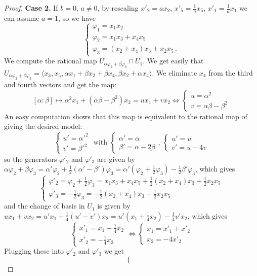 \documentclass[10pt,reqno]{amsart}
\newcommand{\la}{\langle}
\newcommand{\ra}{\rangle}
\renewcommand{\a}{\alpha}
\renewcommand{\b}{\beta}
\newcommand{\f}{\varphi}
\theoremstyle{definition}
\begin{document}
\begin{proof}
\noindent \textbf{Case 2.} If $b=0$, $a \ne 0$, by rescaling $x'_2=a x_2$, $x'_5=\frac1ax_5$, $x'_1=\frac1ax_1$ we can assume $a=1$, so we have 
\[
\begin{cases}
    \f_1=x_1x_2 \\
    \f_2=x_1x_3+x_4x_5 \\
    \f_3=(x_2+x_4)x_3+x_2x_5 \, .
\end{cases} 
\] 
We compute the rational map $U_{\a \f_2 + \b \f_3 } \cap U_1$. We get easily that $U_{\a \f_2 + \b \f_3 }=\la x_3,x_5,\a x_1+\b x_2+\b x_4,\b x_2+\a x_4\ra$. We eliminate $x_4$ from the third and fourth vectors and get the map:
\[
[\a:\b] \mapsto \a^2 x_1 + (\a \b -\b^2)x_2 = ux_1+vx_2 
\iff \begin{cases}
    u=\a^2 \\
    v=\a \b -\b^2
\end{cases}
\]
An easy computation shows that this map is equivalent to the rational map of giving the desired model:
\[
\begin{cases}
    u'=\a'^2 \\
    v'=\b'^2
\end{cases} \text{ with } 
\begin{cases}
    \a'=\a \\
    \b'=\a-2\b
\end{cases} \text{, }
\begin{cases}
    u'=u \\
    v'=u-4v
\end{cases}
\]
so the generators $\f'_2$ and $\f'_3$ are given by 
$\a \f_2+\b \f_3=\a' \f_2 + \tfrac{1}{2}(\a'-\b') \f_3= \a'(\f_2+\tfrac12 \f_3)-\tfrac12 \b' \f_3$,
which gives
\[
\begin{cases}
\f'_2= \f_2+\frac12 \f_3=x_1x_3+x_4x_5+\frac12 (x_2+x_4)x_3+\frac12 x_2x_5 \\
\f'_3=-\frac12 \f_3=-\frac12 (x_2+x_4) x_3-\frac12 x_2x_5
\end{cases}
\]and the change of basis in $U_1$ is given by $ux_1+vx_2=u'x_1+\tfrac14(u'-v')x_2=u'(x_1+\tfrac14 x_2)-\tfrac14 v'x_2$, which gives
\[
\begin{cases}
x'_1= x_1+\tfrac14 x_2 \\
x'_2=-\tfrac14 x_2
\end{cases} 
\iff
\begin{cases}
x_1= x'_1+ x'_2 \\
x_2=-4 x'_2
\end{cases} 
\]
Plugging these into $\f'_2$ and $\f'_3$ we get
\[
\begin{cases}

\end{cases}\]
\end{proof}
\end{document}
